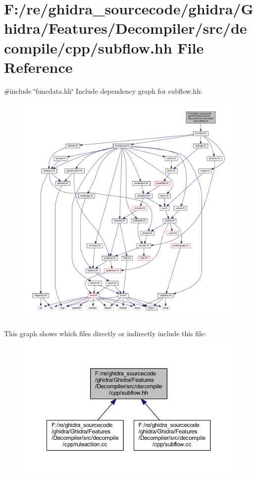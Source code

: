 \hypertarget{subflow_8hh}{}\section{F\+:/re/ghidra\+\_\+sourcecode/ghidra/\+Ghidra/\+Features/\+Decompiler/src/decompile/cpp/subflow.hh File Reference}
\label{subflow_8hh}
{\ttfamily \#include \char`\"{}funcdata.\+hh\char`\"{}}\newline
Include dependency graph for subflow.\+hh\+:
\nopagebreak
\begin{figure}[H]
\begin{center}
\leavevmode
\includegraphics[width=350pt]{subflow_8hh__incl}
\end{center}
\end{figure}
This graph shows which files directly or indirectly include this file\+:
\nopagebreak
\begin{figure}[H]
\begin{center}
\leavevmode
\includegraphics[width=350pt]{subflow_8hh__dep__incl}
\end{center}
\end{figure}
